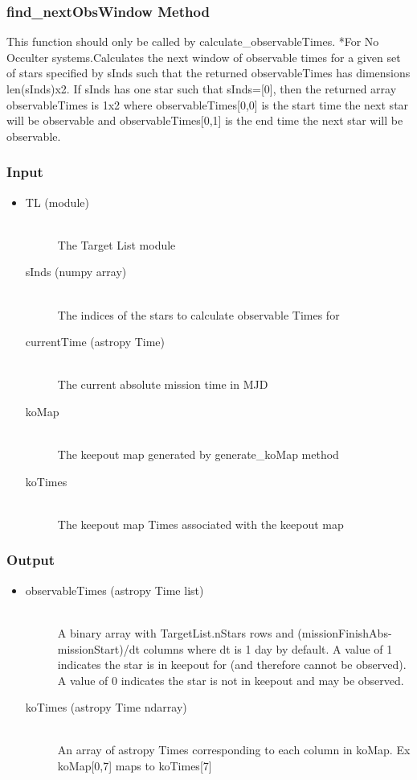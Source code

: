 \documentclass[cleanfoot]{asme2ej}
\begin{document}
\subsubsection{find\_nextObsWindow Method}
This function should only be called by calculate\_observableTimes. *For No Occulter systems.Calculates the next window of observable times for a given set of stars specified by sInds such that the returned observableTimes has dimensions len(sInds)x2. If sInds has one star such that sInds=[0], then the returned array observableTimes is 1x2 where observableTimes[0,0] is the start time the next star will be observable and observableTimes[0,1] is the end time the next star will be observable.
\subsubsection*{Input}
\begin{itemize}
\item 
\begin{description}
    \item[TL (module)] \hfill \\ The Target List module
    \item[sInds (numpy array)] \hfill \\ The indices of the stars to calculate observable Times for
    \item[currentTime (astropy Time)] \hfill \\ The current absolute mission time in MJD
    \item[koMap] \hfill \\ The keepout map generated by generate\_koMap method
    \item[koTimes] \hfill \\ The keepout map Times associated with the keepout map
\end{description}
\end{itemize}
\subsubsection*{Output}
\begin{itemize}
\item 
\begin{description}
    \item[observableTimes (astropy Time list)] \hfill \\ A binary array with TargetList.nStars rows and (missionFinishAbs-missionStart)/dt columns where dt is 1 day by default. A value of 1 indicates the star is in keepout for (and therefore cannot be observed). A value of 0 indicates the star is not in keepout and may be observed.
    \item[koTimes (astropy Time ndarray)] \hfill \\ An array of astropy Times corresponding to each column in koMap. Ex koMap[0,7] maps to koTimes[7] 
\end{description}
\end{itemize}
\end{document}
